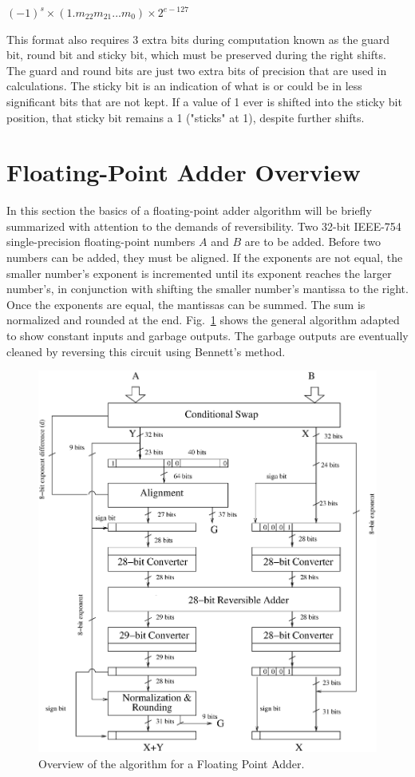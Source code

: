\documentclass[%
reprint,
 amsmath,amssymb,
 aps,
]{revtex4-1}
\begin{document}
$(-1)^s\times(1.m_{22}m_{21}...m_0)\times2^{e-127}$ 

\par This format also requires 3 extra bits during computation known as the guard bit, round bit and sticky bit, which must be preserved during the right shifts. The guard and round bits are just two extra bits of precision that are used in calculations. The sticky bit is an indication of what is or could be in less significant bits that are not kept. If a value of 1 ever is shifted into the sticky bit position, that sticky bit remains a 1 ("sticks" at 1), despite further shifts.

\section{Floating-Point Adder Overview}

In this section the basics of a floating-point adder algorithm will be briefly summarized with attention to the demands of reversibility. Two 32-bit IEEE-754 single-precision floating-point numbers $A$ and $B$ are to be added. Before two numbers can be added, they must be aligned. If the exponents are not equal, the smaller number's exponent is incremented until its exponent reaches the larger number's, in conjunction with shifting the smaller number's mantissa to the right. Once the exponents are equal, the mantissas can be summed. The sum is normalized and rounded at the end. Fig.~\ref{fig:overview} shows the general algorithm adapted to show constant inputs and garbage outputs. The garbage outputs are eventually cleaned by reversing this circuit using Bennett's method.

\begin{figure}[h]
\centering
\includegraphics[width=1\textwidth]{algorithm.eps}
\caption{Overview of the algorithm for a Floating Point Adder.}
\label{fig:overview}
\end{figure}
\end{document}
